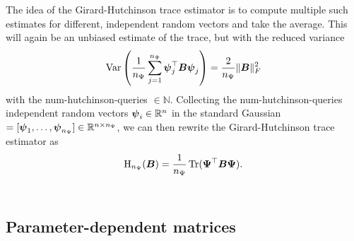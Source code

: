 The idea of the Girard-Hutchinson trace estimator is to compute multiple such estimates
for different, independent random vectors and take the average. This will again
be an unbiased estimate of the trace, but with the reduced variance
\begin{equation}
    \operatorname{Var}\left( \frac{1}{n_{\Psi}} \sum_{j=1}^{n_{\Psi}}\boldsymbol{\psi}_j^{\top} \boldsymbol{B} \boldsymbol{\psi}_j\right) = \frac{2}{n_{\Psi}} \lVert \boldsymbol{B} \rVert _F^2
    \label{equ:2-chebyshev-hutchinson-mse}
\end{equation}
with the \gls{num-hutchinson-queries} $\in \mathbb{N}$.
Collecting the \gls{num-hutchinson-queries} independent random vectors
$\boldsymbol{\psi}_i \in \mathbb{R}^{n}$ in the standard Gaussian
 $= [\boldsymbol{\psi}_1, \dots, \boldsymbol{\psi}_{n_{\Psi}}] \in \mathbb{R}^{n \times n_{\Psi}}$,
we can then rewrite the Girard-Hutchinson trace estimator as
\begin{equation}
    \operatorname{H}_{n_{\Psi}}(\boldsymbol{B}) = \frac{1}{n_{\Psi}} \operatorname{Tr}(\boldsymbol{\Psi}^{\top} \boldsymbol{B} \boldsymbol{\Psi}).
    \label{equ:2-chebyshev-DGC-hutchionson-estimator}
\end{equation}\\

\subsection{Parameter-dependent matrices}
\label{subsec:2-chebyshev-trace-parametrized}


